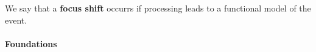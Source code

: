 \begin{defn}\label{def:interest}
\hypertarget{def:interest}{} We say that a \textbf{focus shift}
occurrs if processing leads to a functional model of the event.
\end{defn}


\paragraph{\textbf{\upshape Foundations}}
                                         
